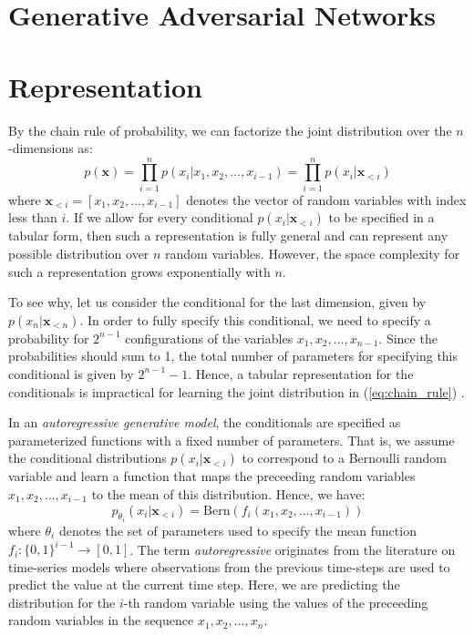 \section{Generative Adversarial Networks}


\section{Representation}

By the chain rule of probability, we can factorize the joint distribution over the $n$-dimensions as:
\[
\begin{equation}
p(\mathbf{x}) = \prod\limits_{i=1}^{n}p(x_i \vert x_1, x_2, \ldots, x_{i-1}) = \prod\limits_{i=1}^{n} p(x_i \vert \mathbf{x}_{<i})
\end{equation}
\label{eq:chain_rule}
\]
where $\mathbf{x}_{<i}=[x_1, x_2, \ldots, x_{i-1}]$ denotes the vector of random variables with index less than $i$. If we allow for every conditional $p(x_i \vert \mathbf{x}_{<i})$ to be specified in a tabular form, then such a representation is fully general and can represent any possible distribution over $n$ random variables. However, the space complexity for such a representation grows exponentially with $n$. 

To see why, let us consider the conditional for the last dimension, given by $p(x_n \vert \mathbf{x}_{<n})$. In order to fully specify this conditional, we need to specify a probability for $2^{n-1}$ configurations of the variables $x_1, x_2, \ldots, x_{n-1}$.  Since the probabilities should sum to 1, the total number of parameters for specifying this conditional is given by $2^{n-1} -1$. Hence, a tabular representation for the conditionals is impractical for learning the joint distribution in (\ref{eq:chain_rule}) . 

In an \textit{autoregressive generative model}, the conditionals are specified as parameterized functions with a fixed number of parameters. That is, we assume the conditional distributions $p(x_i \vert \mathbf{x}_{<i})$ to correspond to a Bernoulli random variable and learn a function that maps the preceeding random variables $x_1, x_2, \ldots, x_{i-1}$ to the mean of this distribution. Hence, we have:
\[
p_{\theta_i}(x_i \vert \mathbf{x}_{<i}) = \mathrm{Bern}(f_i(x_1, x_2, \ldots, x_{i-1}))
\]
where $\theta_i$ denotes the set of parameters used to specify the mean function $f_i: \{0,1\}^{i-1}\rightarrow [0,1]$.  The term \textit{autoregressive} originates from the literature on time-series models where observations from the previous time-steps are used to predict the value at the current time step. Here, we are predicting the distribution for the $i$-th random variable using the values of the preceeding random variables in the sequence $x_1, x_2, \ldots, x_n$.

